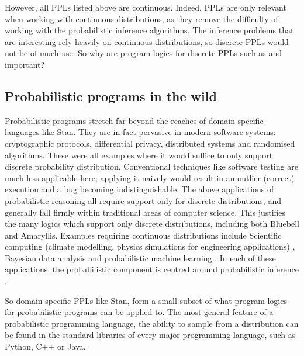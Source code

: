 However, all PPLs listed above are continuous. Indeed, PPLs are only relevant when working with continuous distributions,
as they remove the difficulty of working with the probabilistic inference algorithms. The inference problems that are interesting rely heavily on continuous distributions,
so discrete PPLs would not be of much use. So why are program logics for discrete PPLs such as \citep{bluebell} and \citep{amaryllis} important?

\subsection{Probabilistic programs in the wild}
\label{sec:wild}
Probabilistic programs stretch far beyond the reaches of domain specific languages like Stan. They are in fact pervasive in modern software systems:
cryptographic protocols, differential privacy, distributed systems and randomised algorithms. These were all examples where it would suffice to
only support discrete probability distribution. Conventional techniques like software testing are much less applicable here; applying it naively
would result in an outlier (correct) execution and a bug becoming indistinguishable. The above applications of probabilistic reasoning all require support
only for discrete distributions, and generally fall firmly within traditional areas of computer science. This justifies the many logics which
support only discrete distributions, including both Bluebell and Amaryllis. Examples requiring continuous distributions include
Scientific computing (climate modelling, physics simulations for engineering applications) \citep{sci-comp}, Bayesian data analysis and probabilistic machine learning \citep{pml}.
In each of these applications, the probabilistic component is centred around probabilistic inference \citep{nature}.

So domain specific PPLs like Stan, form a small subset of what program logics for probabilistic programs can be applied to. %
The most general feature of a probabilistic programming language, the ability to sample from a distribution
can be found in the standard libraries of every major programming language, such as Python, C++ or Java. 

